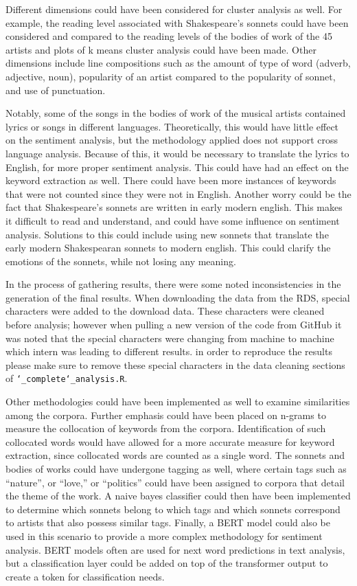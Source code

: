 \documentclass[10pt,a4paper]{article}
\begin{document}
\noindent Different dimensions could have been considered for cluster analysis as well. For example, the reading level associated with Shakespeare’s sonnets could have been considered and compared to the reading levels of the bodies of work of the 45 artists and plots of k means cluster analysis could have been made. Other dimensions include line compositions such as the amount of type of word (adverb, adjective, noun), popularity of an artist compared to the popularity of sonnet, and use of punctuation. 

\noindent Notably, some of the songs in the bodies of work of the musical artists contained lyrics or songs in different languages. Theoretically, this would have little effect on the sentiment analysis, but the methodology applied does not support cross language analysis. Because of this, it would be necessary to translate the lyrics to English, for more proper sentiment analysis. This could have had an effect on the keyword extraction as well. There could have been more instances of keywords that were not counted since they were not in English. Another worry could be the fact that Shakespeare’s sonnets are written in early modern english. This makes it difficult to read and understand, and could have some influence on sentiment analysis. Solutions to this could include using new sonnets that translate the early modern Shakespearan sonnets to modern english. This could clarify the emotions of the sonnets, while not losing any meaning. 

\noindent In the process of gathering results, there were some noted inconsistencies in the generation of the final results. When downloading the data from the RDS, special characters were added to the download data. These characters were cleaned before analysis; however when pulling a new version of the code from GitHub it was noted that the special characters were changing from machine to machine which intern was leading to different results. in order to reproduce the results please make sure to remove these special characters in the data cleaning sections of \texttt{\char`_complete\char`_analysis.R}.

\noindent Other methodologies could have been implemented as well to examine similarities among the corpora. Further emphasis could have been placed on n-grams to measure the collocation of keywords from the corpora. Identification of such collocated words would have allowed for a more accurate measure for keyword extraction, since collocated words are counted as a single word. The sonnets and bodies of works could have undergone tagging as well, where certain tags such as “nature”, or “love,” or “politics” could have been assigned to corpora that detail the theme of the work. A naive bayes classifier could then have been implemented to determine which sonnets belong to which tags and which sonnets correspond to artists that also possess similar tags. Finally, a BERT model could also be used in this scenario to provide a more complex methodology for sentiment analysis. BERT models often are used for next word predictions in text analysis, but a classification layer could be added on top of the transformer output to create a token for classification needs. 
\end{document}
